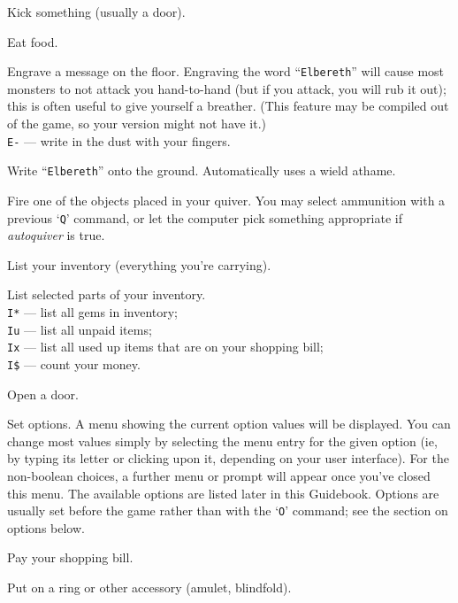 Kick something (usually a door).
\item[\tb{e}]
Eat food.
\item[\tb{E}]
Engrave a message on the floor.
Engraving the word ``{\tt Elbereth}'' will cause most monsters to not attack
you hand-to-hand (but if you attack, you will rub it out); this is
often useful to give yourself a breather.  (This feature may be compiled out
of the game, so your version might not have it.)\\
{\tt E-} --- write in the dust with your fingers.
\item[\tb{\^{}E}]
Write ``{\tt Elbereth}'' onto the ground.
Automatically uses a wield athame.
\item[\tb{f}]
Fire one of the objects placed in your quiver.  You may select
ammunition with a previous `{\tt Q}' command, or let the computer pick
something appropriate if {\it autoquiver\/} is true.
\item[\tb{i}]
List your inventory (everything you're carrying).
\item[\tb{I}]
List selected parts of your inventory.\\
{\tt I*} --- list all gems in inventory;\\
{\tt Iu} --- list all unpaid items;\\
{\tt Ix} --- list all used up items that are on your shopping bill;\\
{\tt I\$} --- count your money.
\item[\tb{o}]
Open a door.
\item[\tb{O}]
Set options.  A menu showing the current option values will be
displayed.  You can change most values simply by selecting the menu
entry for the given option (ie, by typing its letter or clicking upon
it, depending on your user interface).  For the non-boolean choices,
a further menu or prompt will appear once you've closed this menu.
The available options
are listed later in this Guidebook.  Options are usually set before the
game rather than with the `{\tt O}' command; see the section on options below.
\item[\tb{p}]
Pay your shopping bill.
\item[\tb{P}]
Put on a ring or other accessory (amulet, blindfold).
